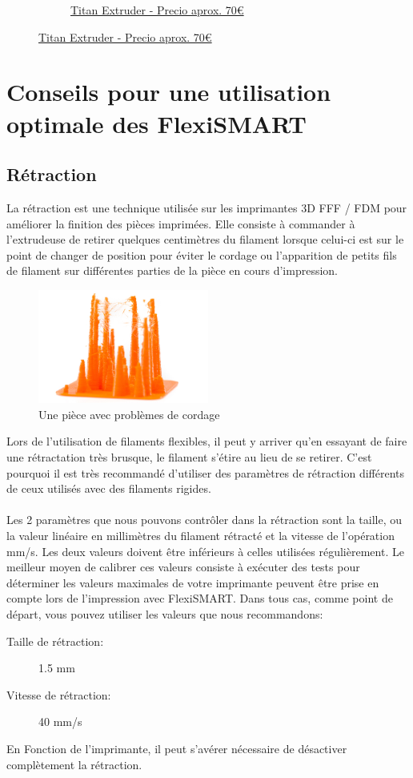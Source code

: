 \documentclass[11pt,a4paper]{article}
\begin{document}
\begin{figure}[H]
\begin{subfigure}[b]{0.4\textwidth}
		\caption*{\href{www.e3d-online.com}{{\footnotesize Titan Extruder - Precio aprox. 70\euro}}}
    \end{subfigure}
\end{figure}
\section{Conseils pour une utilisation optimale des FlexiSMART}
	\subsection{Rétraction}
La rétraction est une technique utilisée sur les imprimantes 3D FFF / FDM pour améliorer la finition des pièces imprimées. Elle consiste à commander à l'extrudeuse de retirer quelques centimètres du filament lorsque celui-ci est sur le point de changer de position pour éviter le cordage ou l'apparition de petits fils de filament sur différentes parties de la pièce en cours d'impression.
\begin{figure}[H]
\centering
\includegraphics[width=0.5\textwidth,cfbox=azul_marcos 4pt 0pt]{FOTOS/RETRACCION1}
\caption*{Une pièce avec problèmes de cordage}
\end{figure}
Lors de l’utilisation de filaments flexibles, il peut y arriver qu’en essayant de faire une rétractation très brusque, le filament s'étire au lieu de se retirer. C’est pourquoi il est très recommandé d’utiliser des paramètres de rétraction différents de ceux utilisés avec des filaments rigides.
\\\\
Les 2 paramètres que nous pouvons contrôler dans la rétraction sont la taille, ou la valeur linéaire en millimètres du filament rétracté et la vitesse de l’opération  mm/s. Les deux valeurs doivent être inférieurs à celles utilisées régulièrement. Le meilleur moyen de calibrer ces valeurs consiste à exécuter des tests pour déterminer  les valeurs maximales de votre imprimante peuvent être prise en compte lors de l’impression avec FlexiSMART. Dans tous  cas, comme point de départ, vous pouvez utiliser les valeurs que nous recommandons:
\begin{description}
\item [Taille de rétraction:] 1.5 mm
\item [Vitesse de rétraction:] 40 mm/s
\end{description}
En Fonction de l’imprimante, il peut s’avérer nécessaire de désactiver complètement la rétraction.
\end{document}
